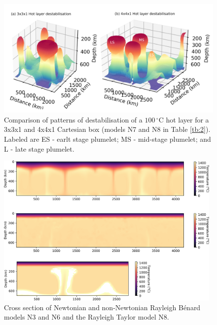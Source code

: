 \documentclass[a4paper,10pt,twocolumn]{paper}
\begin{document}
\begin{figure}
\centering
\includegraphics[width=16cm]{../figures-working/comparison-3x4-lables.png}
\caption{Comparison of patterns of destabilisation of a $100\,^{\circ}$C hot layer for a 3x3x1 and 4x4x1 Cartesian box (models N7 and N8 in Table \ref{tb:2}). Labeled are ES - earlt stage plumelet; MS - mid-stage plumelet; and L - late stage plumelet.}
\label{fg:4}
\end{figure}

\begin{figure}
\centering
\includegraphics[width=11cm]{../figures-working/temperatures.png}
\caption{Cross section of Newtonian and non-Newtonian Rayleigh B{\'e}nard models N3 and N6 and the Rayleigh Taylor model N8.}
\label{fg:5}
\end{figure}
\end{document}
